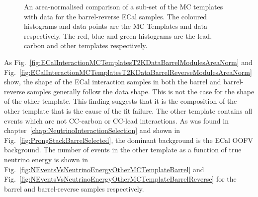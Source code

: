\begin{figure}%
  \centering
  \caption{An area-normalised comparison of a sub-set of the MC templates with data for the barrel-reverse ECal samples.  The coloured histograms and data points are the MC Templates and data respectively.  The red, blue and green histograms are the lead, carbon and other templates respectively.}
  \label{fig:SubsetMCTemplatesT2KDataBarrelReverseModulesAreaNorm}
\end{figure}
As Fig.~\ref{fig:ECalInteractionMCTemplatesT2KDataBarrelModulesAreaNorm} and Fig.~\ref{fig:ECalInteractionMCTemplatesT2KDataBarrelReverseModulesAreaNorm} show, the shape of the ECal interaction samples in both the barrel and barrel-reverse samples generally follow the data shape.  This is not the case for the shape of the other template.  This finding suggests that it is the composition of the other template that is the cause of the fit failure.  The other template contains all events which are not CC-carbon or CC-lead interactions.  As was found in chapter~\ref{chap:NeutrinoInteractionSelection} and shown in Fig.~\ref{fig:ProngStackBarrelSelected}, the dominant background is the ECal OOFV background.  The number of events in the other template as a function of true neutrino energy is shown in Fig.~\ref{fig:NEventsVsNeutrinoEnergyOtherMCTemplateBarrel} and Fig.~\ref{fig:NEventsVsNeutrinoEnergyOtherMCTemplateBarrelReverse} for the barrel and barrel-reverse samples respectively.  
